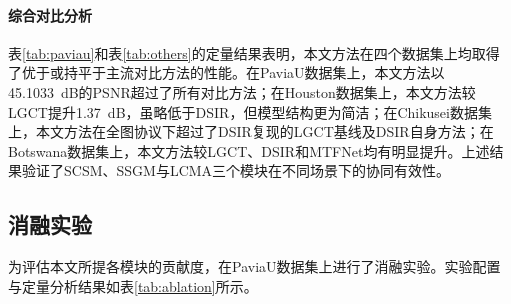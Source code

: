 \documentclass[UTF8,a4paper,11pt]{ctexart}
\begin{document}
\paragraph{综合对比分析}
表\ref{tab:paviau}和表\ref{tab:others}的定量结果表明，本文方法在四个数据集上均取得了优于或持平于主流对比方法的性能。在PaviaU数据集上，本文方法以45.1033~dB的PSNR超过了所有对比方法；在Houston数据集上，本文方法较LGCT提升1.37~dB，虽略低于DSIR，但模型结构更为简洁；在Chikusei数据集上，本文方法在全图协议下超过了DSIR复现的LGCT基线及DSIR自身方法；在Botswana数据集上，本文方法较LGCT、DSIR和MTFNet均有明显提升。上述结果验证了SCSM、SSGM与LCMA三个模块在不同场景下的协同有效性。

\subsection{消融实验}
为评估本文所提各模块的贡献度，在PaviaU数据集上进行了消融实验。实验配置与定量分析结果如表\ref{tab:ablation}所示。
\end{document}
